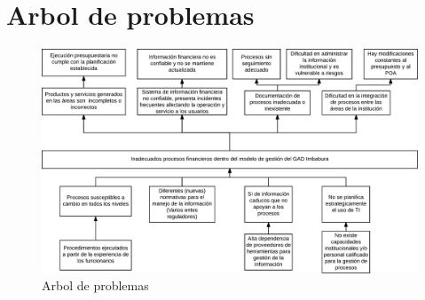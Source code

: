 
\chapter{Arbol de problemas}

\begin{figure}
\includegraphics[scale=0.45]{Anexo1/Figs/ArbolProblemas1}

\caption{Arbol de problemas}
\end{figure}

